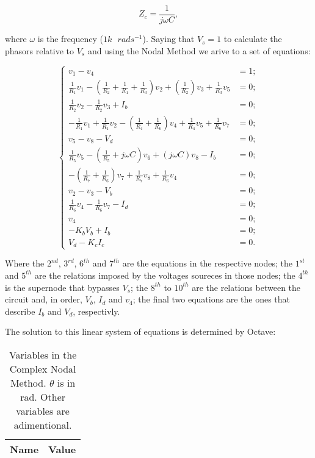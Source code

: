 \begin{equation}
	Z_c = \frac{1}{j \omega C},
\end{equation}

where $\omega$ is the frequency ($1k \text{ }rads^{-1}$).
Saying that $V_s = 1$ to calculate the phasors relative to $V_s$ and using the Nodal Method we arive to a set of equations:

\begin{equation}
\begin{cases}
	v_1 - v_4 &= 1;																				  	  \\
	\frac{1}{R_1}v_1 - (\frac{1}{R_2}+\frac{1}{R_1}+\frac{1}{R_3})v_2 + (\frac{1}{R_2})v_3 + \frac{1}{R_3}v_5 &= 0; \\
  	\frac{1}{R_2}v_2 - \frac{1}{R_2}v_3+ I_b &= 0;													  \\
  	-\frac{1}{R_1}v_1 + \frac{1}{R_1}v_2 - (\frac{1}{R_4}+\frac{1}{R_6})v_4 + \frac{1}{R_4}v_5 + \frac{1}{R_6}v_7 &= 0;			  																	  \\
	v_5 - v_8 - V_d &= 0;																			  \\
  	\frac{1}{R_5}v_5 - (\frac{1}{R_5} + j \omega C)v_6 + (j \omega C)v_8- I_b &= 0;						  \\
  	-(\frac{1}{R_7}+\frac{1}{R_6})v_7 + \frac{1}{R_7}v_8 + \frac{1}{R_6}v_4 &= 0;					  \\
	v_2 - v_3 - V_b &= 0;																			  \\
  	\frac{1}{R_6}v_4 - \frac{1}{R_6}v_7 - I_d &= 0;													  \\
  	v_4 &= 0;																						  \\
  	-K_bV_b + I_b &= 0;																				  \\
  	V_d - K_cI_c &= 0.
\end{cases}
\label{eq:PASSO4}
\end{equation}

Where the $2^{nd}$, $3^{rd}$, $6^{th}$ and $7^{th}$ are the equations in the respective nodes; the $1^{st}$ and $5^{th}$ are the relations imposed by the voltages soureces in those nodes; the $4^{th}$ is the supernode that bypasses $V_s$; the $8^{th}$ to $10^{th}$ are the relations between the circuit and, in order, $V_b$, $I_d$ and $v_4$; the final two equations are the ones that describe $I_b$ and $V_d$, respectivly. 

The solution to this linear system of equations is determined by Octave:

\begin{table}[h]
  \centering
  \begin{tabular}{|l|r|}
    \hline    
    {\bf Name} & {\bf Value} \\ \hline
    
  \end{tabular}
  \caption{Variables in the Complex Nodal Method. $\theta$ is in rad. Other variables are adimentional.}
  \label{tab:TEO_PASSO4}
\end{table}

